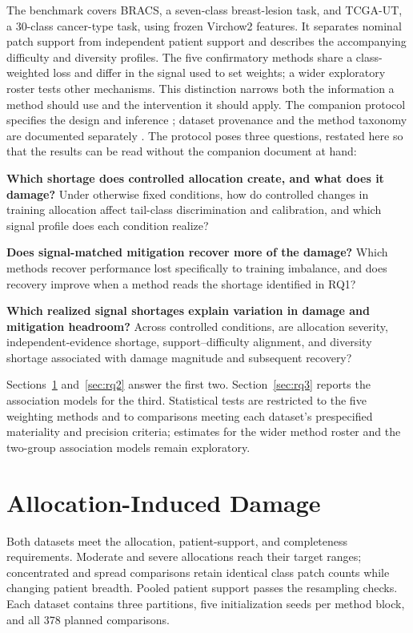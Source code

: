 \documentclass[11pt]{article}
\begin{document}
The benchmark covers BRACS, a seven-class breast-lesion task, and TCGA-UT, a 30-class cancer-type task, using frozen Virchow2 features. It separates nominal patch support from independent patient support and describes the accompanying difficulty and diversity profiles. The five confirmatory methods share a class-weighted loss and differ in the signal used to set weights; a wider exploratory roster tests other mechanisms. This distinction narrows both the information a method should use and the intervention it should apply. The companion protocol specifies the design and inference \citep{queisler2026benchmarkProtocol}; dataset provenance and the method taxonomy are documented separately \citep{queisler2026datasets,queisler2026imbalanceMethods}.
The protocol poses three questions, restated here so that the results can be read without the companion document at hand:
\begin{description}
  \setlength{\itemsep}{0.6em}
  \item[RQ1.] \textbf{Which shortage does controlled allocation create, and what does it damage?} Under otherwise fixed conditions, how do controlled changes in training allocation affect tail-class discrimination and calibration, and which signal profile does each condition realize?
  \item[RQ2.] \textbf{Does signal-matched mitigation recover more of the damage?} Which methods recover performance lost specifically to training imbalance, and does recovery improve when a method reads the shortage identified in RQ1?
  \item[RQ3.] \textbf{Which realized signal shortages explain variation in damage and mitigation headroom?} Across controlled conditions, are allocation severity, independent-evidence shortage, support--difficulty alignment, and diversity shortage associated with damage magnitude and subsequent recovery?
\end{description}
\noindent Sections~\ref{sec:rq1} and~\ref{sec:rq2} answer the first two. Section~\ref{sec:rq3} reports the association models for the third. Statistical tests are restricted to the five weighting methods and to comparisons meeting each dataset's prespecified materiality and precision criteria; estimates for the wider method roster and the two-group association models remain exploratory.

\section{Allocation-Induced Damage}
\label{sec:rq1}
Both datasets meet the allocation, patient-support, and completeness requirements. Moderate and severe allocations reach their target ranges; concentrated and spread comparisons retain identical class patch counts while changing patient breadth. Pooled patient support passes the resampling checks. Each dataset contains three partitions, five initialization seeds per method block, and all \num{378} planned comparisons.
\end{document}
